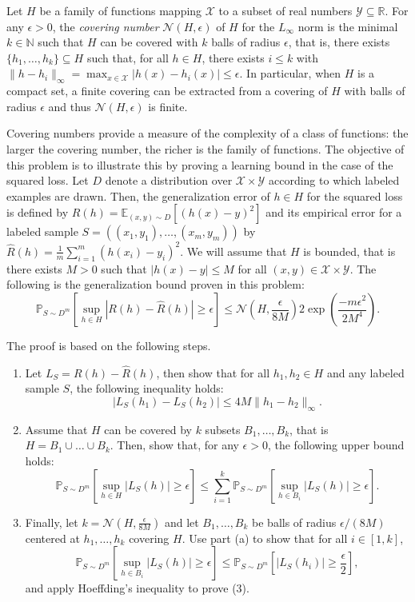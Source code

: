 \documentclass[letterpaper, 11pt]{article}
\newcommand{\1}{\mathds{1}}	%
\theoremstyle{definition}
\begin{document}
Let $H$ be a family of functions mapping $\mathcal{X}$ to a subset of real numbers $\mathcal{Y} \subseteq \mathbb{R}$. For any $\epsilon > 0$, the \textit{covering number} $\mathcal{N}(H, \epsilon)$ of $H$ for the $L_\infty$ norm is the minimal $k \in \mathbb{N}$ such that $H$ can be covered with $k$ balls of radius $\epsilon$, that is, there exists $\{h_1, \ldots, h_k\} \subseteq H$ such that, for all $h \in H$, there exists $i \leq k$ with $\|h - h_i\|_\infty = \max_{x \in \mathcal{X}} |h(x) - h_i(x)| \leq \epsilon$. In particular, when $H$ is a compact set, a finite covering can be extracted from a covering of $H$ with balls of radius $\epsilon$ and thus $\mathcal{N}(H, \epsilon)$ is finite.

Covering numbers provide a measure of the complexity of a class of functions: the larger the covering number, the richer is the family of functions. The objective of this problem is to illustrate this by proving a learning bound in the case of the squared loss. Let $D$ denote a distribution over $\mathcal{X} \times \mathcal{Y}$ according to which labeled examples are drawn. Then, the generalization error of $h \in H$ for the squared loss is defined by $R(h) = \mathbb{E}_{(x,y) \sim D}[(h(x) - y)^2]$ and its empirical error for a labeled sample $S = ((x_1, y_1), \ldots, (x_m, y_m))$ by $\widehat{R}(h) = \frac{1}{m}\sum_{i=1}^m (h(x_i) - y_i)^2$. We will assume that $H$ is bounded, that is there exists $M > 0$ such that $|h(x) - y| \leq M$ for all $(x, y) \in \mathcal{X} \times \mathcal{Y}$. The following is the generalization bound proven in this problem:
\[
\mathbb{P}_{S \sim D^m}\left[\sup_{h \in H} |R(h) - \widehat{R}(h)| \geq \epsilon\right] \leq \mathcal{N}\left(H, \frac{\epsilon}{8M}\right) 2 \exp\left(\frac{-m\epsilon^2}{2M^4}\right). \tag{1}
\]

The proof is based on the following steps.

\begin{enumerate}
\item Let $L_S = R(h) - \widehat{R}(h)$, then show that for all $h_1, h_2 \in H$ and any labeled sample $S$, the following inequality holds:
\[
|L_S(h_1) - L_S(h_2)| \leq 4M \|h_1 - h_2\|_\infty.
\]

\item Assume that $H$ can be covered by $k$ subsets $B_1, \ldots, B_k$, that is $H = B_1 \cup \ldots \cup B_k$. Then, show that, for any $\epsilon > 0$, the following upper bound holds:
\[
\mathbb{P}_{S \sim D^m}\left[\sup_{h \in H} |L_S(h)| \geq \epsilon\right] \leq \sum_{i=1}^k \mathbb{P}_{S \sim D^m}\left[\sup_{h \in B_i} |L_S(h)| \geq \epsilon\right].
\]

\item Finally, let $k = \mathcal{N}(H, \frac{\epsilon}{8M})$ and let $B_1, \ldots, B_k$ be balls of radius $\epsilon/(8M)$ centered at $h_1, \ldots, h_k$ covering $H$. Use part (a) to show that for all $i \in [1, k]$,
\[
\mathbb{P}_{S \sim D^m}\left[\sup_{h \in B_i} |L_S(h)| \geq \epsilon\right] \leq \mathbb{P}_{S \sim D^m}\left[|L_S(h_i)| \geq \frac{\epsilon}{2}\right],
\]
and apply Hoeffding's inequality to prove (3).
\end{enumerate}
\end{document}
